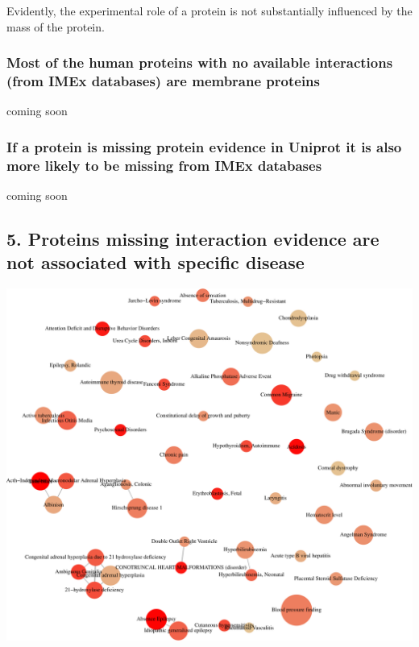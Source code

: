 \documentclass[]{article}
\begin{document}
Evidently, the experimental role of a protein is not substantially
influenced by the mass of the protein.

\subsubsection{Most of the human proteins with no available interactions
(from IMEx databases) are membrane
proteins}\label{most-of-the-human-proteins-with-no-available-interactions-from-imex-databases-are-membrane-proteins}

coming soon

\subsubsection{If a protein is missing protein evidence in Uniprot it is
also more likely to be missing from IMEx
databases}\label{if-a-protein-is-missing-protein-evidence-in-uniprot-it-is-also-more-likely-to-be-missing-from-imex-databases}

coming soon

\subsection{5. Proteins missing interaction evidence are not associated
with specific
disease}\label{proteins-missing-interaction-evidence-are-not-associated-with-specific-disease}

\includegraphics{final_report_files/figure-latex/disease_enrichment_map-1.pdf}
\end{document}
